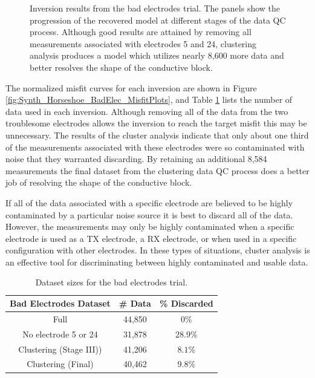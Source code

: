 \documentclass[final,authoryear,5p,times,twocolumn]{elsarticle}
\begin{document}
\begin{figure} [!ht]
\begin{center}
{       } %
    \end{center}
\caption{Inversion results from the bad electrodes trial. The panels show the progression of the recovered model at different stages of the data QC process. Although good results are attained by removing all measurements associated with electrodes 5 and 24, clustering analysis produces a model which utilizes nearly 8,600 more data and better resolves the shape of the conductive block.}
\label{fig:Synth_Horseshoe_BadElec}
\end{figure}

The normalized misfit curves for each inversion are shown in Figure \ref{fig:Synth_Horseshoe_BadElec_MisfitPlots}, and Table \ref{tab:Synth_BadElec_Sizes} lists the number of data used in each inversion. Although removing all of the data from the two troublesome electrodes allows the inversion to reach the target misfit this may be unnecessary. The results of the cluster analysis indicate that only about one third of the measurements associated with these electrodes were so contaminated with noise that they warranted discarding. By retaining an additional 8,584 measurements the final dataset from the clustering data QC process does a better job of resolving the shape of the conductive block.

If all of the data associated with a specific electrode are believed to be highly contaminated by a particular noise source it is best to discard all of the data. However, the measurements may only be highly contaminated when a specific electrode is used as a TX electrode, a RX electrode, or when used in a specific configuration with other electrodes. In these types of situations, cluster analysis is an effective tool for discriminating between highly contaminated and usable data.

\begin{table}[!ht]
\small
\begin{center}
  \begin{tabular}{| c | c | c |}
    \hline
    \bf{Bad Electrodes Dataset} & \bf{\# Data} &  \bf{\% Discarded} \\
    \hline
    Full & 44,850 & $0 \%$\\
    \hline
    No electrode 5 or 24 & 31,878 & $28.9 \%$\\ %
    \hline
    Clustering (Stage III)) & 41,206 & $8.1 \%$\\
    \hline
    Clustering (Final) & 40,462 & $9.8 \%$\\ %
    \hline
  \end{tabular}
\caption{Dataset sizes for the bad electrodes trial.}
\label{tab:Synth_BadElec_Sizes}
\end{center}
\end{table}
\end{document}
